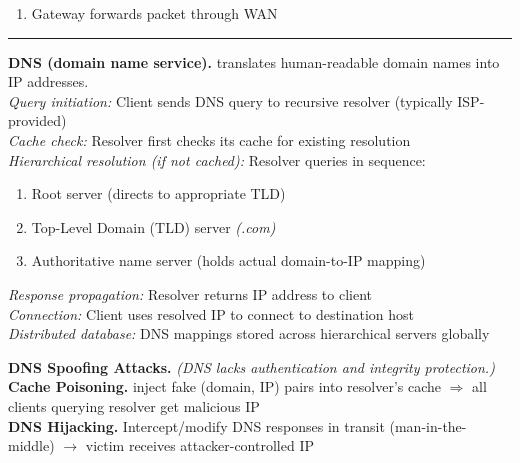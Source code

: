 \documentclass[9pt, a4paper]{extarticle}
\makeatletter
\renewcommand{\hline}{\noalign{\vskip 2px}\hrule\@height\arrayrulewidth\@width\linewidth\noalign{\vskip 2px}}
\makeatother
\begin{document}
\begin{minipage}[t]{0.5\textwidth}
\begin{minipage}[t]{0.5\textwidth}
\begin{enumerate}[leftmargin=4pt,labelsep=0pt,itemsep=0pt,resume=mainenum]
\begin{enumerate}[leftmargin=4pt,labelsep=0pt,itemsep=0pt]
\begin{enumerate}[leftmargin=4pt,labelsep=0pt,itemsep=0pt]
					            \item Wait for ARP reply with gateway MAC
					            \item Cache mapping $IP_{gateway} \leftrightarrow MAC$
					            \item Send packet to gateway using MAC address
				            \end{enumerate}
				      \item Gateway forwards packet through WAN
			      \end{enumerate}
		\end{enumerate}
	\end{minipage}\hline
	\begin{minipage}[t]{0.48\textwidth}
		\textbf{DNS (domain name service).} translates human-readable domain names into IP addresses.\\
		\textit{Query initiation:} Client sends DNS query to recursive resolver (typically ISP-provided)\\
		\textit{Cache check:} Resolver first checks its cache for existing resolution\\
		\textit{Hierarchical resolution (if not cached):} Resolver queries in sequence:
		\begin{enumerate}[leftmargin=6pt, labelsep=0pt, itemsep=0pt]
			\item Root server (directs to appropriate TLD)
			\item Top-Level Domain (TLD) server \textit{(.com)}
			\item Authoritative name server (holds actual domain-to-IP mapping)
		\end{enumerate}
		\textit{Response propagation:} Resolver returns IP address to client\\
		\textit{Connection:} Client uses resolved IP to connect to destination host\\
		\textit{Distributed database:} DNS mappings stored across hierarchical servers globally
	\end{minipage}\hfill\vline\hfill
	\begin{minipage}[t]{0.50\textwidth}
		\textbf{DNS Spoofing Attacks.} \textit{(DNS lacks authentication and integrity protection.)}\\
		\textbf{Cache Poisoning.} inject fake (domain, IP) pairs into resolver's cache $\Rightarrow$ all clients querying resolver get malicious IP\\
		\textbf{DNS Hijacking.} Intercept/modify DNS responses in transit (man-in-the-middle) $\rightarrow$ victim receives attacker-controlled IP\\

\end{minipage}
\end{minipage}
\end{document}
